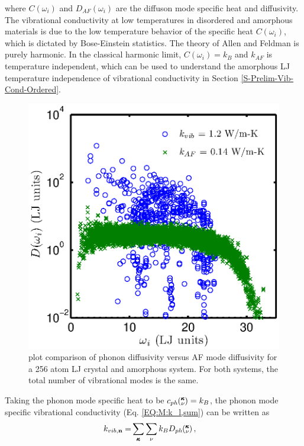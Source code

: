 \documentclass[letterpaper,12pt]{article}
\newcommand{\kv}{\mspace{-4.0mu}\left(\mspace{-8.0mu}\begin{smallmatrix}&\pmb{\kappa} \\&\nu\end{smallmatrix}\mspace{-3.0mu}\right)}
\begin{document}
where $C(\omega_i)$ and $D_{AF}(\omega_i)$ are the diffuson mode specific heat and diffusivity. The vibrational conductivity at low temperatures in disordered and amorphous materials is due to the low temperature behavior of the specific heat $C(\omega_i)$, which is dictated by Bose-Einstein statistics.\cite{allen1993} The theory of Allen and Feldman is purely harmonic. In the classical harmonic limit, $C(\omega_i) = k_{B}$ and $k_{AF}$ is temperature independent, which can be used to understand the amorphous LJ temperature independence of vibrational conductivity in Section \ref{S-Prelim-Vib-Cond-Ordered}.
\begin{figure}
\begin{center}
\includegraphics[scale=0.6]{phonon_diff.eps}
\vspace*{-5mm}
\end{center}
\caption{\label{FIG:phonon_diff} plot comparison of phonon diffusivity versus AF mode diffusivity for a 256 atom LJ crystal and amorphous system. For both systems, the total number of vibrational modes is the same.}
\end{figure}
Taking the phonon mode specific heat to be $c_{ph} \kv = k_{B}$, the phonon mode specific vibrational conductivity (Eq$.$ \eqref{EQ:M:k_l,sum}) can be written as
\begin{equation}\label{EQ:k_sum}
\begin{split}
k_{vib,\mathbf{n}}=&\sum_{\pmb{\kappa}} \sum_\nu k_{B} D_{ph}\kv,
\end{split}
\end{equation}
\end{document}
